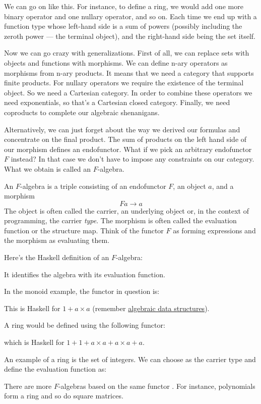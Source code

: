 We can go on like this. For instance, to define a ring, we would add one
more binary operator and one nullary operator, and so on. Each time we
end up with a function type whose left-hand side is a sum of powers
(possibly including the zeroth power --- the terminal object), and the
right-hand side being the set itself.

Now we can go crazy with generalizations. First of all, we can replace
sets with objects and functions with morphisms. We can define n-ary
operators as morphisms from n-ary products. It means that we need a
category that supports finite products. For nullary operators we require
the existence of the terminal object. So we need a Cartesian category.
In order to combine these operators we need exponentials, so that's a
Cartesian closed category. Finally, we need coproducts to complete our
algebraic shenanigans.

Alternatively, we can just forget about the way we derived our formulas
and concentrate on the final product. The sum of products on the left
hand side of our morphism defines an endofunctor. What if we pick an
arbitrary endofunctor $F$ instead? In that case we don't have to
impose any constraints on our category. What we obtain is called an
$F$-algebra.

An $F$-algebra is a triple consisting of an endofunctor $F$, an
object $a$, and a morphism
\[F a \to a\]
The object is often called the carrier, an underlying object or, in the
context of programming, the carrier \emph{type}. The morphism is often
called the evaluation function or the structure map. Think of the
functor $F$ as forming expressions and the morphism as evaluating
them.

Here's the Haskell definition of an $F$-algebra:

It identifies the algebra with its evaluation function.

In the monoid example, the functor in question is:

This is Haskell for $1 + a\times{}a$ (remember
\hyperref[simple-algebraic-data-types]{algebraic
	data structures}).

A ring would be defined using the following functor:

which is Haskell for $1 + 1 + a\times{}a + a\times{}a + a$.

An example of a ring is the set of integers. We can choose
 as the carrier type and define the evaluation function
as:

There are more $F$-algebras based on the same functor . For
instance, polynomials form a ring and so do square matrices.

